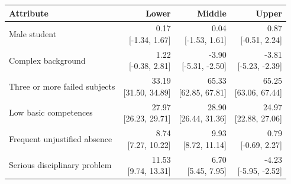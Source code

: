 \begin{tabular}{@{}p{4.5cm}rrr@{}}
\toprule
Attribute & Lower & Middle & Upper \\
\midrule
Male student & \shortstack{0.17\\{[-1.34, 1.67]}} & \shortstack{0.04\\{[-1.53, 1.61]}} & \shortstack{0.87\\{[-0.51, 2.24]}} \\
Complex background & \shortstack{1.22\\{[-0.38, 2.81]}} & \shortstack{-3.90\\{[-5.31, -2.50]}} & \shortstack{-3.81\\{[-5.23, -2.39]}} \\
Three or more failed subjects & \shortstack{33.19\\{[31.50, 34.89]}} & \shortstack{65.33\\{[62.85, 67.81]}} & \shortstack{65.25\\{[63.06, 67.44]}} \\
Low basic competences & \shortstack{27.97\\{[26.23, 29.71]}} & \shortstack{28.90\\{[26.44, 31.36]}} & \shortstack{24.97\\{[22.88, 27.06]}} \\
Frequent unjustified absence & \shortstack{8.74\\{[7.27, 10.22]}} & \shortstack{9.93\\{[8.72, 11.14]}} & \shortstack{0.79\\{[-0.69, 2.27]}} \\
Serious disciplinary problem & \shortstack{11.53\\{[9.74, 13.31]}} & \shortstack{6.70\\{[5.45, 7.95]}} & \shortstack{-4.23\\{[-5.95, -2.52]}} \\
\bottomrule
\end{tabular}
